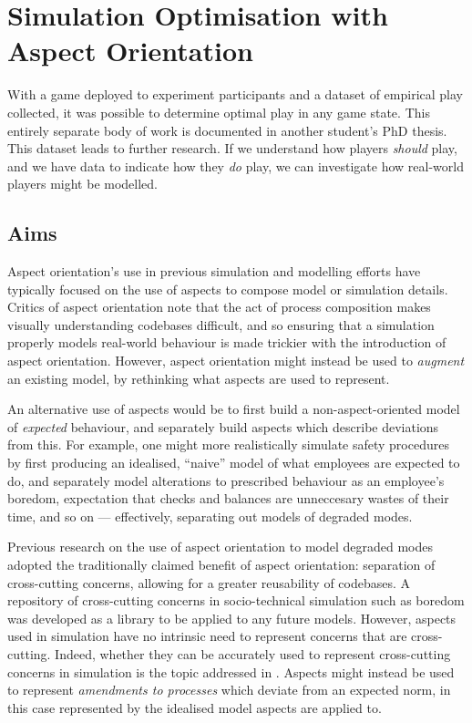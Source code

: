 \chapter{Simulation Optimisation with Aspect Orientation}\label{chap:exp1_simulation_optimisation}

With a game deployed to experiment participants and a dataset of empirical play
collected, it was possible to determine optimal play in any game state. This
entirely separate body of work is documented in another student's PhD
thesis. This dataset leads to
further research. If we understand how players \emph{should} play, and we have
data to indicate how they \emph{do} play, we can investigate how real-world
players might be modelled. 

\section{Aims}\label{sec:aop_simulation_optimisation_aims}

Aspect orientation's use in previous simulation and modelling efforts have
typically focused on the use of aspects to compose model or simulation
details. Critics of aspect orientation note that
the act of process composition makes visually understanding codebases difficult,
and so ensuring that a simulation properly models real-world behaviour is made
trickier with the introduction of aspect orientation. However, aspect
orientation might instead be used to \emph{augment} an existing model, by
rethinking what aspects are used to represent.

An alternative use of aspects would be to first build a non-aspect-oriented
model of \emph{expected} behaviour, and separately build aspects which describe
deviations from this. For example, one might more realistically simulate safety
procedures by first producing an idealised, ``naive'' model of what employees
are expected to do, and separately model alterations to prescribed behaviour as
an employee's boredom, expectation that checks and balances are unneccesary
wastes of their time, and so on --- effectively, separating out models of
degraded modes\cite{johnson2007degradedmodes}.

Previous research on the use of aspect orientation to model degraded modes
adopted the traditionally claimed benefit of aspect orientation: separation of
cross-cutting concerns, allowing for a greater reusability of
codebases\cite{wallis2018caise}. A repository of cross-cutting concerns in
socio-technical simulation such as boredom was developed as a library to be
applied to any future models\cite{fuzzimoss_repo}. However, aspects used in
simulation have no intrinsic need to represent concerns that are cross-cutting.
Indeed, whether they can be accurately used to represent cross-cutting concerns
in simulation is the topic addressed in . Aspects
might instead be used to represent \emph{amendments to processes} which deviate
from an expected norm, in this case represented by the idealised model aspects
are applied to.


